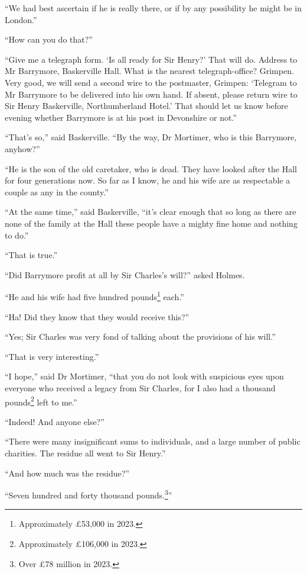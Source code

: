\documentclass[paper=5.5in:8.5in,BCOR=7mm,twoside,DIV=calc,12pt,usegeometry,openany,chapterprefix,endperiod,headings=big]{scrbook} %
\begin{document}
\enquote{We had best ascertain if he is really there, or if by any possibility he might be in London.}

\enquote{How can you do that?}

\enquote{Give me a telegraph form. \enquote{Is all ready for Sir Henry?} That will do. Address to Mr Barrymore, Baskerville Hall. What is the nearest telegraph-office? Grimpen. Very good, we will send a second wire to the postmaster, Grimpen: \enquote{Telegram to Mr Barrymore to be delivered into his own hand. If absent, please return wire to Sir Henry Baskerville, Northumberland Hotel.} That should let us know before evening whether Barrymore is at his post in Devonshire or not.}

\enquote{That's so,} said Baskerville. \enquote{By the way, Dr Mortimer, who is this Barrymore, anyhow?}

\enquote{He is the son of the old caretaker, who is dead. They have looked after the Hall for four generations now. So far as I know, he and his wife are as respectable a couple as any in the county.}

\enquote{At the same time,} said Baskerville, \enquote{it's clear enough that so long as there are none of the family at the Hall these people have a mighty fine home and nothing to do.}

\enquote{That is true.}

\enquote{Did Barrymore profit at all by Sir Charles's will?} asked Holmes.

\enquote{He and his wife had five hundred pounds\footnote{Approximately \pounds 53,000 in 2023.} each.}

\enquote{Ha! Did they know that they would receive this?}

\enquote{Yes; Sir Charles was very fond of talking about the provisions of his will.}

\enquote{That is very interesting.}

\enquote{I hope,} said Dr Mortimer, \enquote{that you do not look with suspicious eyes upon everyone who received a legacy from Sir Charles, for I also had a thousand pounds\footnote{Approximately \pounds 106,000 in 2023.} left to me.}

\enquote{Indeed! And anyone else?}

\enquote{There were many insignificant sums to individuals, and a large number of public charities. The residue all went to Sir Henry.}

\enquote{And how much was the residue?}

\enquote{Seven hundred and forty thousand pounds.\footnote{Over \pounds 78 million in 2023.}}
\end{document}

